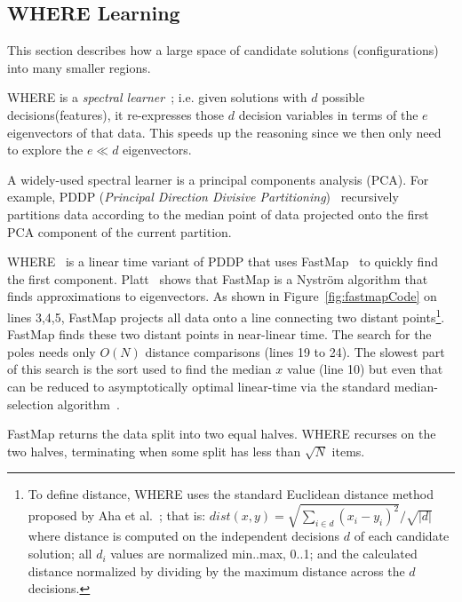 \documentclass{sig-alternative}
\newcommand{\fig}[1]{Figure~\ref{fig:#1}}
\begin{document}
\subsection{WHERE Learning}\label{sec:spectral}
This section describes how a large space of candidate solutions (configurations) into many smaller regions.

WHERE is a {\em spectral learner}~\cite{kamvar2003spectral}; i.e. given solutions with $d$ possible decisions(features), it re-expresses those $d$ decision variables in terms of the $e$ eigenvectors of that data.
This speeds up the reasoning since we then only need to explore the $e\ll d$   eigenvectors.

A widely-used spectral learner is a principal components analysis (PCA). For example, PDDP ({\em Principal Direction Divisive Partitioning})~\cite{boley1998principal} recursively partitions data according to the median point of data projected onto the first PCA component of the current partition.

WHERE~\cite{me12d} is a linear time variant of PDDP  that uses FastMap~\cite{Faloutsos1995} to quickly find the first component.
Platt~\cite{platt05} shows that FastMap is a  Nystr\"om algorithm that finds approximations to eigenvectors.
As shown in \fig{fastmapCode} on lines 3,4,5, FastMap  projects all data onto a line connecting two distant points\footnote{
To define distance, WHERE uses the standard Euclidean distance method proposed by Aha et al.~\cite{aha91}; that is: $dist(x,y)= \sqrt{\sum_{i\in d} (x_i - y_i)^2}/\sqrt{ \left\vert{d}\right\vert }$ where distance is computed on the independent decisions $d$ of each candidate solution; all $d_i$ values are normalized min..max, 0..1; and the calculated distance normalized by dividing by the maximum distance across the $d$ decisions.}. 
FastMap finds these two distant points in near-linear time. 
The search for the poles needs only $O(N)$ distance comparisons (lines 19 to 24).
The slowest part of this search is the sort used to find the median $x$ value (line 10) but even that can be reduced to  asymptotically optimal linear-time via the standard median-selection algorithm~\cite{hoare61}.

FastMap returns the data split into two equal halves.
WHERE recurses on the two halves, terminating when some split has less than $\sqrt{N}$ items.
\end{document}
